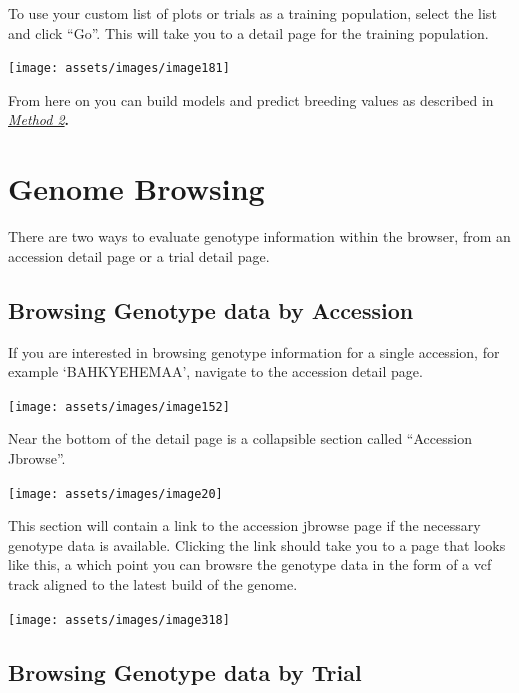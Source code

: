 \documentclass[
  12pt,
]{book}
\begin{document}
To use your custom list of plots or trials as a training population, select the list and click ``Go''. This will take you to a detail page for the training population.

\begin{center}\texttt{[image: assets/images/image181]} \end{center}

From here on you can build models and predict breeding values as described in \protect\hyperlink{method-2}{\emph{Method 2}}\textbf{.}

\hypertarget{genome-browsing}{%
\section{Genome Browsing}\label{genome-browsing}}

There are two ways to evaluate genotype information within the browser, from an accession detail page or a trial detail page.

\hypertarget{browsing-genotype-data-by-accession}{%
\subsection{Browsing Genotype data by Accession}\label{browsing-genotype-data-by-accession}}

If you are interested in browsing genotype information for a single accession, for example `BAHKYEHEMAA', navigate to the accession detail page.

\begin{center}\texttt{[image: assets/images/image152]} \end{center}

Near the bottom of the detail page is a collapsible section called ``Accession Jbrowse''.

\begin{center}\texttt{[image: assets/images/image20]} \end{center}

This section will contain a link to the accession jbrowse page if the necessary genotype data is available. Clicking the link should take you to a page that looks like this, a which point you can browsre the genotype data in the form of a vcf track aligned to the latest build of the genome.

\begin{center}\texttt{[image: assets/images/image318]} \end{center}

\hypertarget{browsing-genotype-data-by-trial}{%
\subsection{Browsing Genotype data by Trial}\label{browsing-genotype-data-by-trial}}
\end{document}

